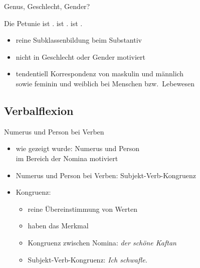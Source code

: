 \begin{frame}
  {Genus, Geschlecht, Gender?}
  \pause
  \begin{exe}
    \ex \label{ex:genus039}
    \begin{xlist}
      \ex \alert{Die Petunie} ist .
      \ex {} ist .
      \ex {} ist .
    \end{xlist}
  \end{exe}
  \pause
  \Halbzeile
  \begin{itemize}[<+->]
    \item reine Subklassenbildung beim Substantiv
    \item nicht in Geschlecht oder Gender motiviert
    \item tendentiell Korrespondenz von maskulin und männlich\\
      sowie feminin und weiblich bei Menschen bzw.\ Lebewesen
  \end{itemize}
\end{frame}

\subsection{Verbalflexion}

\begin{frame}
  {Numerus und Person bei Verben}
  \pause
  \begin{itemize}[<+->]
    \item wie gezeigt wurde: \alert{Numerus} und \alert{Person}\\
      im Bereich der Nomina motiviert
    \item Numerus und Person bei Verben: Subjekt-Verb-Kongruenz 
      \Halbzeile
    \item Kongruenz:
      \begin{itemize}[<+->]
        \item reine \alert{Übereinstimmung von Werten}
        \item {} haben das Merkmal
        \item \alert{Kongruenz zwischen Nomina}: \textit{der schöne Kaftan}
        \item \alert{Subjekt-Verb-Kongruenz}: \textit{Ich schwafle.}
      \end{itemize}
  \end{itemize}
\end{frame}

